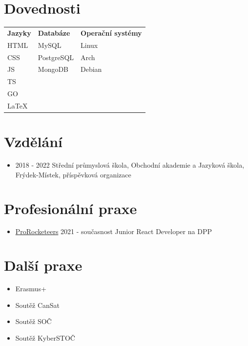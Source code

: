 \documentclass[12pt,a4paper]{article}
\begin{document}
\section*{Dovednosti}

\begin{center}
  \begin{tabular}{ l l l }
    \textbf{\large Jazyky} & \textbf{\large Databáze} & \textbf{\large Operační
      systémy}
    \\
    HTML                   & MySQL                    & Linux
    \\
    CSS                    & PostgreSQL               & Arch
    \\
    JS                     & MongoDB                  & Debian
    \\
    TS
    \\
    GO
    \\
    LaTeX
    \\
  \end{tabular}
\end{center}

\section*{Vzdělání}

\begin{itemize}
  \item 2018 - 2022 Střední průmyslová škola, Obchodní akademie a
        Jazyková škola,
        Frýdek-Místek, příspěvková organizace
\end{itemize}

\section*{Profesionální praxe}
\begin{itemize}
  \item \href{https://www.prorocketeers.com/}{ProRocketeers} 2021 - současnost
        \subitem Junior React Developer na DPP
\end{itemize}

\section*{Další praxe}

\begin{itemize}
  \item Erasmus+
  \item Soutěž CanSat
  \item Soutěž SOČ
  \item Soutěž KyberSTOČ
\end{itemize}
\end{document}
